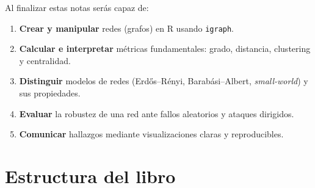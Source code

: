 \documentclass[
  letterpaper,
  DIV=11,
  numbers=noendperiod]{scrreprt}
\providecommand{\tightlist}{%
  \setlength{\itemsep}{0pt}\setlength{\parskip}{0pt}}
\begin{document}
\begin{tcolorbox}[enhanced jigsaw, toprule=.15mm, colframe=quarto-callout-note-color-frame, coltitle=black, titlerule=0mm, colback=white, breakable, leftrule=.75mm, arc=.35mm, bottomtitle=1mm, toptitle=1mm, rightrule=.15mm, bottomrule=.15mm, left=2mm, title=\textcolor{quarto-callout-note-color}{\faInfo}\hspace{0.5em}{🎯 Objetivos generales del libro}, colbacktitle=quarto-callout-note-color!10!white, opacityback=0, opacitybacktitle=0.6]

Al finalizar estas notas serás capaz de:

\begin{enumerate}
\def\labelenumi{\arabic{enumi}.}
\tightlist
\item
  \textbf{Crear y manipular} redes (grafos) en R usando \texttt{igraph}.
\item
  \textbf{Calcular e interpretar} métricas fundamentales: grado,
  distancia, clustering y centralidad.
\item
  \textbf{Distinguir} modelos de redes (Erdős--Rényi, Barabási--Albert,
  \emph{small-world}) y sus propiedades.
\item
  \textbf{Evaluar} la robustez de una red ante fallos aleatorios y
  ataques dirigidos.
\item
  \textbf{Comunicar} hallazgos mediante visualizaciones claras y
  reproducibles.
\end{enumerate}

\end{tcolorbox}

\section*{Estructura del libro}\label{estructura-del-libro}

\end{document}
